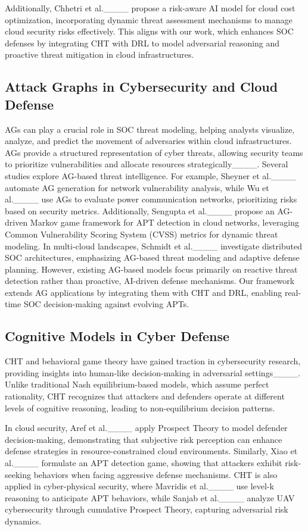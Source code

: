 Additionally, Chhetri et al.____ propose a risk-aware AI model for cloud cost optimization, incorporating dynamic threat assessment mechanisms to manage cloud security risks effectively. This aligns with our work, which enhances SOC defenses by integrating CHT with DRL to model adversarial reasoning and proactive threat mitigation in cloud infrastructures.

\subsection{Attack Graphs in Cybersecurity and Cloud Defense}
AGs can play a crucial role in SOC threat modeling, helping analysts visualize, analyze, and predict the movement of adversaries within cloud infrastructures. AGs provide a structured representation of cyber threats, allowing security teams to prioritize vulnerabilities and allocate resources strategically____.
Several studies explore AG-based threat intelligence. For example, Sheyner et al.____ automate AG generation for network vulnerability analysis, while Wu et al.____ use AGs to evaluate power communication networks, prioritizing risks based on security metrics. Additionally, Sengupta et al.____ propose an AG-driven Markov game framework for APT detection in cloud networks, leveraging Common Vulnerability Scoring System (CVSS) metrics for dynamic threat modeling.
In multi-cloud landscapes, Schmidt et al.____ investigate distributed SOC architectures, emphasizing AG-based threat modeling and adaptive defense planning. However, existing AG-based models focus primarily on reactive threat detection rather than proactive, AI-driven defense mechanisms. Our framework extends AG applications by integrating them with CHT and DRL, enabling real-time SOC decision-making against evolving APTs.

\subsection{Cognitive Models in Cyber Defense}
CHT and behavioral game theory have gained traction in cybersecurity research, providing insights into human-like decision-making in adversarial settings____. Unlike traditional Nash equilibrium-based models, which assume perfect rationality, CHT recognizes that attackers and defenders operate at different levels of cognitive reasoning, leading to non-equilibrium decision patterns.

In cloud security, Aref et al.____ apply Prospect Theory to model defender decision-making, demonstrating that subjective risk perception can enhance defense strategies in resource-constrained cloud environments. Similarly, Xiao et al.____ formulate an APT detection game, showing that attackers exhibit risk-seeking behaviors when facing aggressive defense mechanisms.
CHT is also applied in cyber-physical security, where Mavridis et al.____ use level-k reasoning to anticipate APT behaviors, while Sanjab et al.____ analyze UAV cybersecurity through cumulative Prospect Theory, capturing adversarial risk dynamics.

